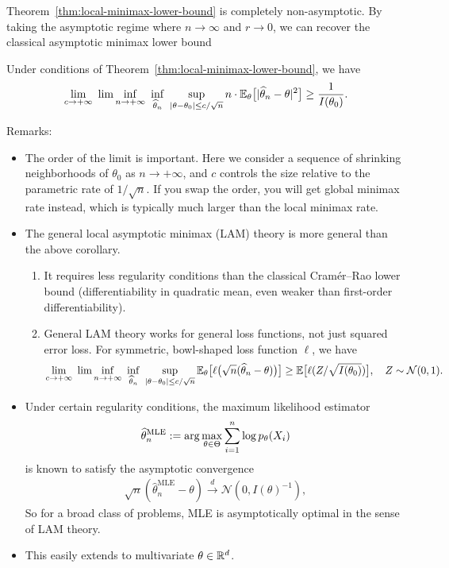 \documentclass[11pt,letterpaper]{article}
\numberwithin{theorem}{lecture}
\numberwithin{proposition}{lecture}
\numberwithin{lemma}{lecture}
\numberwithin{claim}{lecture}
\numberwithin{corollary}{lecture}
\numberwithin{definition}{lecture}
\numberwithin{conjecture}{lecture}
\numberwithin{remark}{lecture}
\numberwithin{example}{lecture}
\numberwithin{equation}{lecture}
\begin{document}
Theorem~\ref{thm:local-minimax-lower-bound} is completely non-asymptotic. By taking the asymptotic regime where $n \rightarrow \infty$ and $r \rightarrow 0$, we can recover the classical asymptotic minimax lower bound
\begin{corollary}\label{cor:lam}
Under conditions of Theorem~\ref{thm:local-minimax-lower-bound}, we have
\begin{align*}
  \lim_{c \rightarrow + \infty} ~\lim\inf_{n \rightarrow + \infty}~ \inf_{\widehat{\theta}_n} ~\sup_{|\theta - \theta_0| \leq c / \sqrt{n}} n \cdot {\mathbb{E}}_\theta \big[ |\widehat{\theta}_n - \theta|^2 \big] \geq \frac{1}{I(\theta_0)}.
\end{align*}
\end{corollary}
Remarks:
\begin{itemize}
  \item The order of the limit is important. Here we consider a sequence of shrinking neighborhoods of $\theta_0$ as $n \rightarrow + \infty$, and $c$ controls the size relative to the parametric rate of $1/\sqrt{n}$. If you swap the order, you will get global minimax rate instead, which is typically much larger than the local minimax rate.
  \item The general local asymptotic minimax (LAM) theory is more general than the above corollary.
  \begin{enumerate}
    \item It requires less regularity conditions than the classical Cram\'{e}r--Rao lower bound (differentiability in quadratic mean, even weaker than first-order differentiability).
    \item General LAM theory works for general loss functions, not just squared error loss. For symmetric, bowl-shaped loss function $\ell$, we have
    \begin{align*}
      \lim_{c \rightarrow + \infty} ~\lim\inf_{n \rightarrow + \infty}~ \inf_{\widehat{\theta}_n} ~\sup_{|\theta - \theta_0| \leq c / \sqrt{n}} {\mathbb{E}}_\theta \big[ \ell \big( \sqrt{n} (\widehat{\theta}_n - \theta) \big) \big] \geq {\mathbb{E}} \big[ \ell (Z / \sqrt{I(\theta_0)}) \big], \quad Z \sim \mathcal{N} (0, 1).
    \end{align*}
  \end{enumerate}
  \item Under certain regularity conditions, the maximum likelihood estimator
  \begin{align*}
    \widehat{\theta}_n^{\mathrm{MLE}} := \arg\max_{\theta \in \Theta} \sum_{i=1}^n \log p_\theta (X_i)
  \end{align*}
  is known to satisfy the asymptotic convergence
  \begin{align*}
    \sqrt{n} (\widehat{\theta}_n^{\mathrm{MLE}} - \theta) \overset{d}{\longrightarrow} \mathcal{N} (0, I(\theta)^{-1}),
  \end{align*}
  So for a broad class of problems, MLE is asymptotically optimal in the sense of LAM theory.
  \item This easily extends to multivariate $\theta \in \mathbb{R}^d$.
\end{itemize}
\end{document}
